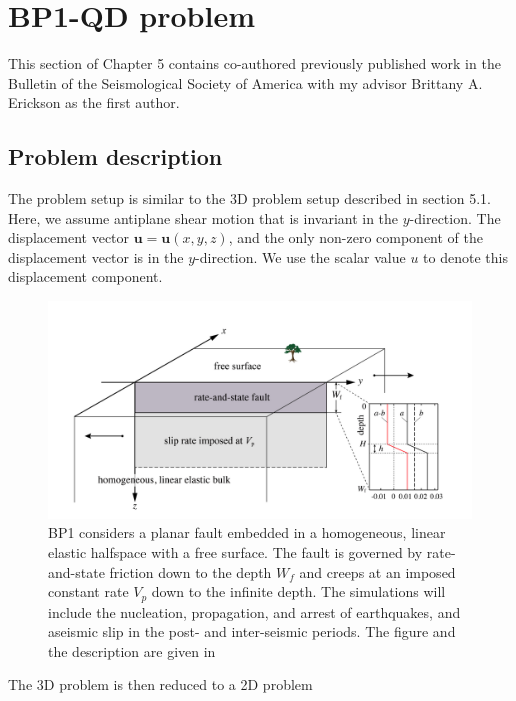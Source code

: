 \section{BP1-QD problem}
This section of Chapter 5 contains co-authored previously published work in the Bulletin of the Seismological Society of America with my advisor Brittany A. Erickson as the first author.
\subsection{Problem description}
The problem setup is similar to the 3D problem setup described in section 5.1. Here, we assume antiplane shear motion that is invariant in the $y$-direction.
The displacement vector $\textbf{u} = \textbf{u}(x,y,z)$, and the only non-zero component of the displacement vector is in the $y$-direction.
We use the scalar value $u$ to denote this displacement component.

\begin{figure}
    \centering
    \includegraphics[width=\linewidth]{figures/BP1-figure}
    \caption{BP1 considers a planar fault embedded in a homogeneous, linear elastic halfspace with a free surface. The fault is governed by rate-and-state friction down to the depth $W_f$ and creeps at an imposed constant rate $V_p$ down to the infinite depth. The simulations will include the nucleation, propagation, and arrest of earthquakes, and aseismic slip in the post- and inter-seismic periods. The figure and the description are given in \citep{erickson2018seas}}
    \label{fig:enter-label}
\end{figure}



The 3D problem is then reduced to a 2D problem

